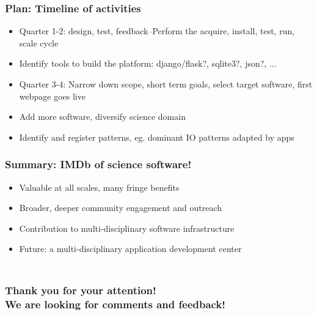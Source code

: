 \documentclass[hyperref={pdfpagelabels=false},12pt]{beamer}
\begin{document}
\begin{frame}
\frametitle{Plan: Timeline of activities }
\begin{itemize}
\itemsep1em
\item Quarter 1-2: design, test, feedback--Perform the acquire, install, test, run, scale cycle
\item Identify tools to build the platform: django/flask?, sqlite3?, json?, ...
\item Quarter 3-4: Narrow down scope, short term goals, select target software, first webpage goes live
\item Add more software, diversify science domain
\item Identify and register patterns, eg. dominant IO patterns adapted by apps
\end{itemize}
\end{frame}

\begin{frame}
\frametitle{Summary: IMDb of science software!}
\begin{itemize}
\itemsep1em
\item Valuable at all scales, many fringe benefits
\item Broader, deeper community engagement and outreach
\item Contribution to multi-disciplinary software infrastructure
\item Future: a multi-disciplinary application development center
\end{itemize}
\end{frame}

\begin{frame}
\frametitle{\\ \centering Thank you for your attention! \\ We are looking for comments and feedback!}
\end{frame}
\end{document}
